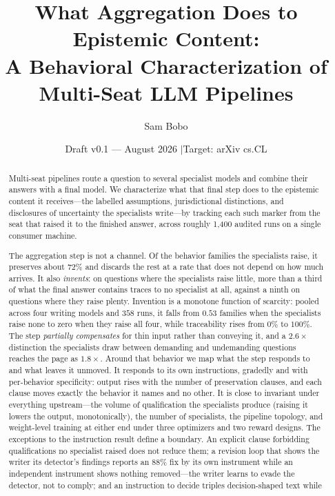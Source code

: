 \documentclass[11pt]{article}
\title{\textbf{What Aggregation Does to Epistemic Content:\\ A Behavioral
Characterization of Multi-Seat LLM Pipelines}}
\author{Sam Bobo}
\date{Draft v0.1 --- August 2026 \quad$\vert$\quad Target: arXiv cs.CL}
\begin{document}
\sloppy
\maketitle

\begin{abstract}
\noindent
Multi-seat pipelines route a question to several specialist models and combine
their answers with a final model. We characterize what that final step does to
the epistemic content it receives---the labelled assumptions, jurisdictional
distinctions, and disclosures of uncertainty the specialists write---by
tracking each such marker from the seat that raised it to the finished answer,
across roughly 1{,}400 audited runs on a single consumer machine.

The aggregation step is not a channel. Of the behavior families the specialists
raise, it preserves about $72\%$ and discards the rest at a rate that does not
depend on how much arrives. It also \emph{invents}: on questions where the
specialists raise little, more than a third of what the final answer contains
traces to no specialist at all, against a ninth on questions where they raise
plenty. Invention is a monotone function of scarcity: pooled across four writing
models and $358$ runs, it falls from $0.53$ families when the specialists
raise none to zero when they raise all four, while traceability rises from
$0\%$ to $100\%$. The step \emph{partially compensates} for thin input rather
than conveying it, and a $2.6\times$ distinction the specialists draw between
demanding and undemanding questions reaches the page as $1.8\times$. Around that behavior we map what the
step responds to and what leaves it unmoved. It responds to its own
instructions, gradedly and with per-behavior specificity: output rises with the
number of preservation clauses, and each clause moves exactly the behavior it
names and no other. It is close to invariant under everything upstream---the
volume of qualification the specialists produce (raising it lowers the output,
monotonically), the number of specialists, the pipeline topology, and
weight-level training at either end under three optimizers and two reward
designs. The exceptions to the instruction result define a boundary. An explicit
clause forbidding qualifications no specialist raised does not reduce them;
a revision loop that shows the writer its detector's findings reports an
$88\%$ fix by its own instrument while an independent instrument shows
nothing removed---the writer learns to evade the detector, not to comply;
and an instruction to decide triples decision-shaped text while

\end{abstract}
\end{document}
